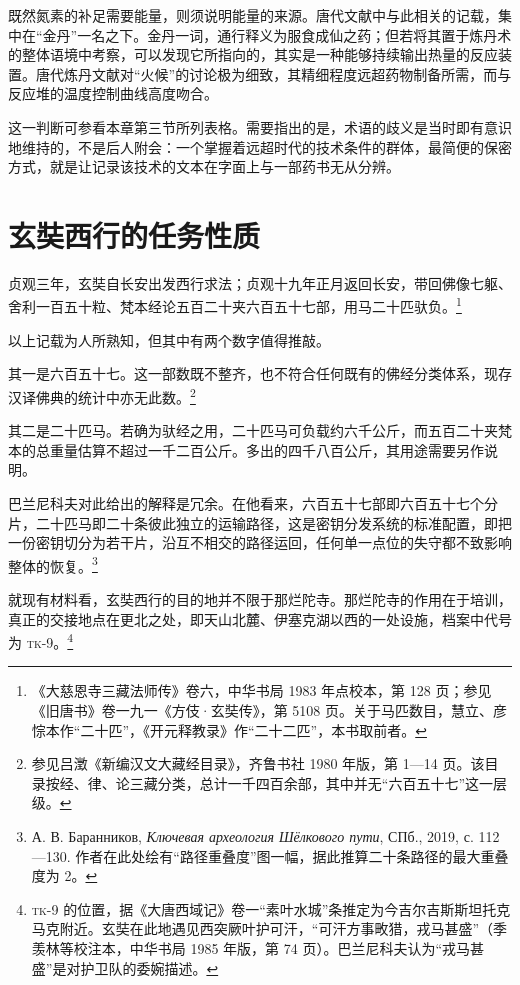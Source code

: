 既然氮素的补足需要能量，则须说明能量的来源。唐代文献中与此相关的记载，集中在“金丹”一名之下。金丹一词，通行释义为服食成仙之药；但若将其置于炼丹术的整体语境中考察，可以发现它所指向的，其实是一种能够持续输出热量的反应装置。唐代炼丹文献对“火候”的讨论极为细致，其精细程度远超药物制备所需，而与反应堆的温度控制曲线高度吻合。

这一判断可参看本章第三节所列表格。需要指出的是，术语的歧义是当时即有意识地维持的，不是后人附会：一个掌握着远超时代的技术条件的群体，最简便的保密方式，就是让记录该技术的文本在字面上与一部药书无从分辨。

\section{玄奘西行的任务性质}

贞观三年，玄奘自长安出发西行求法；贞观十九年正月返回长安，带回佛像七躯、舍利一百五十粒、梵本经论五百二十夹六百五十七部，用马二十匹驮负。\footnote{《大慈恩寺三藏法师传》卷六，中华书局 1983 年点校本，第 128 页；参见《旧唐书》卷一九一《方伎·玄奘传》，第 5108 页。关于马匹数目，慧立、彦悰本作“二十匹”，《开元释教录》作“二十二匹”，本书取前者。}

以上记载为人所熟知，但其中有两个数字值得推敲。

其一是六百五十七。这一部数既不整齐，也不符合任何既有的佛经分类体系，现存汉译佛典的统计中亦无此数。\footnote{参见吕澂《新编汉文大藏经目录》，齐鲁书社 1980 年版，第 1—14 页。该目录按经、律、论三藏分类，总计一千四百余部，其中并无“六百五十七”这一层级。}

其二是二十匹马。若确为驮经之用，二十匹马可负载约六千公斤，而五百二十夹梵本的总重量估算不超过一千二百公斤。多出的四千八百公斤，其用途需要另作说明。

巴兰尼科夫对此给出的解释是冗余。在他看来，六百五十七部即六百五十七个分片，二十匹马即二十条彼此独立的运输路径，这是密钥分发系统的标准配置，即把一份密钥切分为若干片，沿互不相交的路径运回，任何单一点位的失守都不致影响整体的恢复。\footnote{А. В. Баранников, \textit{Ключевая археология Шёлкового пути}, СПб., 2019, с. 112—130. 作者在此处绘有“路径重叠度”图一幅，据此推算二十条路径的最大重叠度为 2。}

就现有材料看，玄奘西行的目的地并不限于那烂陀寺。那烂陀寺的作用在于培训，真正的交接地点在更北之处，即天山北麓、伊塞克湖以西的一处设施，档案中代号为 \textsc{tk-9}。\footnote{\textsc{tk-9} 的位置，据《大唐西域记》卷一“素叶水城”条推定为今吉尔吉斯斯坦托克马克附近。玄奘在此地遇见西突厥叶护可汗，“可汗方事畋猎，戎马甚盛”（季羡林等校注本，中华书局 1985 年版，第 74 页）。巴兰尼科夫认为“戎马甚盛”是对护卫队的委婉描述。}

